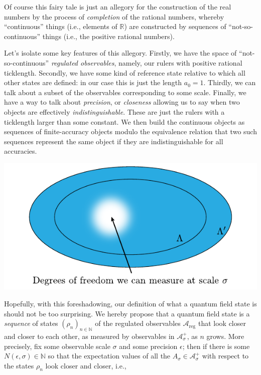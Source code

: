 \documentclass[11pt]{amsart}
\theoremstyle{plain}%
\theoremstyle{definition}
\theoremstyle{remark}
\begin{document}
Of course this fairy tale is just an allegory for the construction of the real numbers by the process of \emph{completion} of the rational numbers, whereby ``continuous'' things (i.e., elements of $\mathbb{R}$) are constructed by sequences of ``not-so-continuous'' things (i.e., the positive rational numbers).

Let's isolate some key features of this allegory. Firstly, we have the space of ``not-so-continuous'' \emph{regulated observables}, namely, our rulers with positive rational ticklength. Secondly, we have some kind of reference state relative to which all other states are defined: in our case this is just the length $a_0 = 1$. Thirdly, we can talk about a subset of the observables corresponding to some scale. Finally, we have a way to talk about \emph{precision}, or \emph{closeness} allowing us to say when two objects are effectively \emph{indistinguishable}. These are just the rulers with a ticklength larger than some constant. We then build the continuous objects as sequences of finite-accuracy objects modulo the equivalence relation that two such sequences represent the same object if they are indistinguishable for all accuracies.
\begin{center}
	\includegraphics{renormalisability.pdf}
\end{center}
Hopefully, with this foreshadowing, our definition of what a quantum field state is should not be too surprising. We hereby propose that a quantum field state is a \emph{sequence} of states $(\rho_n)_{n\in\mathbb{N}}$ of the regulated observables $\mathcal{A}_{\text{reg}}$ that look closer and closer to each other, as measured by observables in $\mathcal{A}_\sigma^+$, as $n$ grows. More precisely, fix some observable scale $\sigma$ and some precision $\epsilon$; then if there is some $N(\epsilon, \sigma) \in \mathbb{N}$ so that the expectation values of all the $A_\sigma\in \mathcal{A}_\sigma^+$ with respect to the states $\rho_n$ look closer and closer, i.e.,
\end{document}
